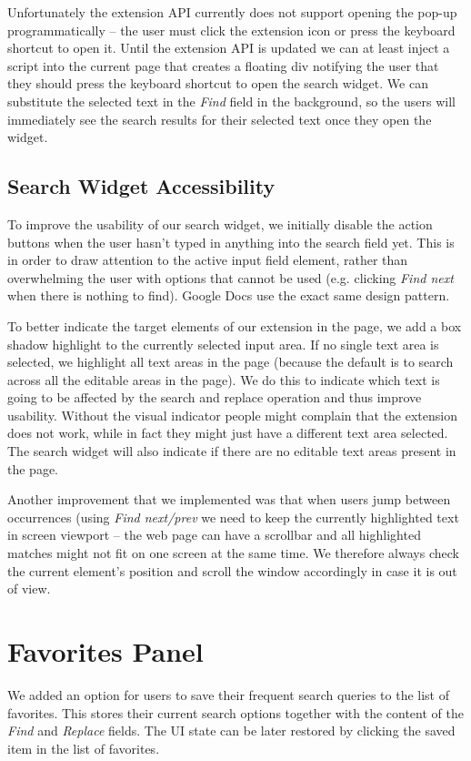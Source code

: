 \documentclass[bsc,frontabs,twoside,singlespacing,parskip,deptreport]{infthesis}
\begin{document}
Unfortunately the extension API currently does not support opening the pop-up programmatically \cite{A19} -- the user must click the extension icon or press the keyboard shortcut to open it. Until the extension API is updated we can at least inject a script into the current page that creates a floating div notifying the user that they should press the keyboard shortcut to open the search widget. We can substitute the selected text in the \textit{Find} field in the background, so the users will immediately see the search results for their selected text once they open the widget.

\subsection{Search Widget Accessibility}
To improve the usability of our search widget, we initially disable the action buttons when the user hasn't typed in anything into the search field yet. This is in order to draw attention to the active input field element, rather than overwhelming the user with options that cannot be used (e.g. clicking \textit{Find next} when there is nothing to find). Google Docs use the exact same design pattern. 

To better indicate the target elements of our extension in the page, we add a box shadow highlight to the currently selected input area. If no single text area is selected, we highlight all text areas in the page (because the default is to search across all the editable areas in the page). We do this to indicate which text is going to be affected by the search and replace operation and thus improve usability. Without the visual indicator people might complain that the extension does not work, while in fact they might just have a different text area selected. The search widget will also indicate if there are no editable text areas present in the page.

Another improvement that we implemented was that when users jump between occurrences (using \textit{Find next/prev} we need to keep the currently highlighted text in screen viewport -- the web page can have a scrollbar and all highlighted matches might not fit on one screen at the same time. We therefore always check the current element's position and scroll the window accordingly in case it is out of view.

\section{Favorites Panel}
We added an option for users to save their frequent search queries to the list of favorites. This stores their current search options together with the content of the \textit{Find} and \textit{Replace} fields. The UI state can be later restored by clicking the saved item in the list of favorites.
\end{document}
